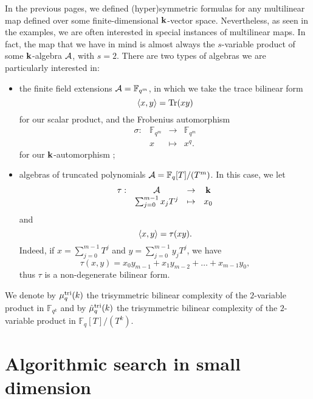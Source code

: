 In the previous pages, we defined (hyper)symmetric formulas for any
multilinear map defined over some finite-dimensional $\mathbf{k}$-vector space.
Nevertheless, as seen in the examples, we are often interested in special
instances of multilinear maps. In fact, the map that we have in mind is almost
always the $s$-variable product of some $\mathbf{k}$-algebra $\mathcal{A}$, with $s=2$. There are
two types of algebras we are particularly interested in:
\begin{itemize}
  \item the finite field extensions $\mathcal{A}=\mathbb{F}_{q^m}$, in which we take the
    trace bilinear form
    \[
      \left\langle x,y\right\rangle=\operatorname{Tr}(xy)
    \]
    for our scalar product, and the Frobenius automorphism
    \[
  \begin{array}{cccc}
    \sigma: & \mathbb{F}_{q^m} & \to & \mathbb{F}_{q^m} \\
    & x & \mapsto & x^q.
  \end{array}
\]
for our $\mathbf{k}$-automorphism ;
\item algebras of truncated polynomials $\mathcal{A} = \mathbb{F}_q[T]/(T^m)$. In this
  case, we let 
  \[
  \begin{array}{cccc}
    \tau: & \mathcal{A} & \to & \mathbf{k} \\
    & \sum_{j=0}^{m-1}x_j T^j & \mapsto & x_0
  \end{array}
\]
and
\[
  \left\langle x,y\right\rangle = \tau(xy).
\]
Indeed, if $x=\sum_{j=0}^{m-1}T^j$ and $y=\sum_{j=0}^{m-1}y_jT^j$, we have
\[
  \tau(x, y) = x_0y_{m-1} + x_1y_{m-2} + \dots + x_{m-1}y_0,
\]
thus $\tau$ is a non-degenerate bilinear form.
\end{itemize}
We denote by $\mu^{\textrm{tri}}_q(k)$ the trisymmetric bilinear complexity of the
$2$-variable product in $\mathbb{F}_{q^k}$ and by $\hat\mu^{\textrm{tri}}_q(k)$ the
trisymmetric bilinear complexity of the $2$-variable product in
$\mathbb{F}_q[T]/(T^k)$.

\section{Algorithmic search in small dimension}

